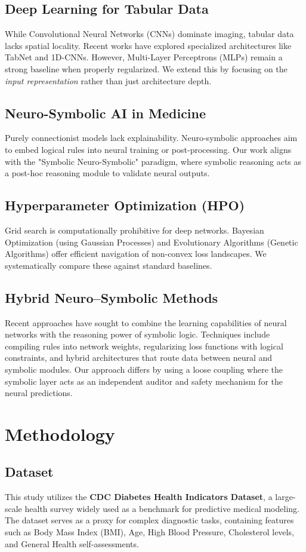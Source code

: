 \documentclass[conference]{IEEEtran}
\begin{document}
\subsection{Deep Learning for Tabular Data}
While Convolutional Neural Networks (CNNs) dominate imaging, tabular data lacks spatial locality. Recent works have explored specialized architectures like TabNet and 1D-CNNs. However, Multi-Layer Perceptrons (MLPs) remain a strong baseline when properly regularized. We extend this by focusing on the \textit{input representation} rather than just architecture depth.

\subsection{Neuro-Symbolic AI in Medicine}
Purely connectionist models lack explainability. Neuro-symbolic approaches aim to embed logical rules into neural training or post-processing. Our work aligns with the "Symbolic Neuro-Symbolic" paradigm, where symbolic reasoning acts as a post-hoc reasoning module to validate neural outputs.

\subsection{Hyperparameter Optimization (HPO)}
Grid search is computationally prohibitive for deep networks. Bayesian Optimization (using Gaussian Processes) and Evolutionary Algorithms (Genetic Algorithms) offer efficient navigation of non-convex loss landscapes. We systematically compare these against standard baselines.

\subsection{Hybrid Neuro--Symbolic Methods}
Recent approaches have sought to combine the learning capabilities of neural networks with the reasoning power of symbolic logic. Techniques include compiling rules into network weights, regularizing loss functions with logical constraints, and hybrid architectures that route data between neural and symbolic modules. Our approach differs by using a loose coupling where the symbolic layer acts as an independent auditor and safety mechanism for the neural predictions.
\section{Methodology}

\subsection{Dataset}
 This study utilizes the \textbf{CDC Diabetes Health Indicators Dataset}, a large-scale health survey widely used as a benchmark for predictive medical modeling. The dataset serves as a proxy for complex diagnostic tasks, containing features such as Body Mass Index (BMI), Age, High Blood Pressure, Cholesterol levels, and General Health self-assessments.
\end{document}
